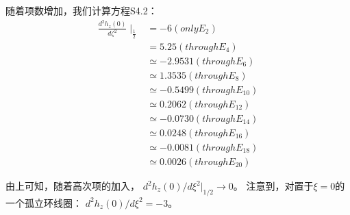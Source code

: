 随着项数增加，我们计算方程S4.2：
\begin{eqnarray}
\frac{d^2h_z(0)}{d\zeta^2}\mid_{\frac{1}{2}}&=-6(only E_2)\\
&=5.25   (through E_4)\\
&\simeq -2.9531   (through E_6)\\
&\simeq 1.3535 (through E_8)\\
&\simeq -0.5499   (through E_{10})\\
&\simeq 0.2062   (through E_{12})\\
&\simeq -0.0730   (through E_{14})\\
&\simeq 0.0248   (through E_{16})\\
&\simeq-0.0081   (through E_{18})\\
&\simeq 0.0026   (through E_{20})
\end{eqnarray}


由上可知，随着高次项的加入， $d^2h_z(0)/d\xi^2|_{1/2}\rightarrow 0$。
注意到，对置于$\xi=0$的一个孤立环线圈： $d^2h_z(0)/d\xi^2=−3$。
\newpage


